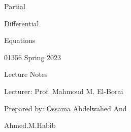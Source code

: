 \documentclass[]{article}
\begin{document}
\begingroup
{}
\par\sffamily\selectfont
\color{cover}
\fontsize{80pt}{0}\selectfont Partial\par
\fontsize{80pt}{0}\selectfont Differential\par
\fontsize{80pt}{0}\selectfont Equations\par
\begin{center}
    {\LARGE 01356 Spring 2023}\par
    \vspace*{1cm}
    {\Huge Lecture Notes}\par       
\end{center}
\color{white}
\vspace*{4.5cm}
\fontsize{22pt}{0}\selectfont Lecturer: Prof. Mahmoud M. El-Borai\par
\fontsize{22pt}{0}\selectfont Prepared by: Ossama Abdelwahed And\par
\hspace*{4cm}
\fontsize{22pt}{0}\selectfont Ahmed.M.Habib\par
\endgroup
\end{document}
